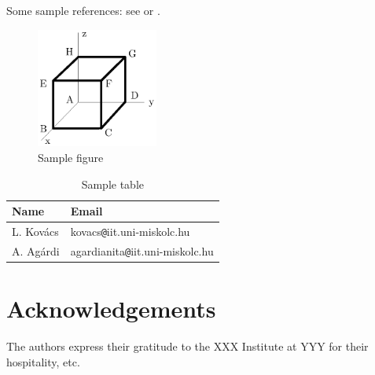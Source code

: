 \documentclass{PSAIE}%
\begin{document}
\noindent Some sample references: see
\cite{ChenYhou1992,Paulino1995} or \cite{Gurtin1972}.

\begin{figure}[h!]
\begin{center}
\includegraphics[keepaspectratio,width=4cm]{FigureOne.eps}
\caption{Sample figure}
\end{center}
\end{figure}

\begin{table}[h]
\caption{Sample table}
\begin{tabular}{|l|l|}
\hline \textbf{Name} & \textbf{Email} \\
\hline L. Kov\'acs & kovacs\verb+@+iit.uni-miskolc.hu \\
\hline A. Ag\'ardi & agardianita\verb+@+iit.uni-miskolc.hu \\
\hline
\end{tabular}
\end{table}


\section*{Acknowledgements} %
\noindent
The authors express their gratitude to the XXX Institute at YYY for
their hospitality, etc.







\end{document}
